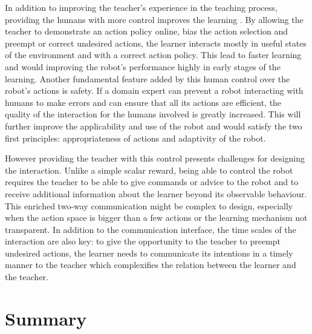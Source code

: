 In addition to improving the teacher's experience in the teaching process, providing the humans with more control improves the learning \citep{thomaz2008teachable,chernova2009interactive}. By allowing the teacher to demonstrate an action policy online, bias the action selection and preempt or correct undesired actions, the learner interacts mostly in useful states of the environment and with a correct action policy. This lead to faster learning and would improving the robot's performance highly in early stages of the learning. Another fundamental feature added by this human control over the robot's actions is safety. If a domain expert can prevent a robot interacting with humans to make errors and can ensure that all its actions are efficient, the quality of the interaction for the humans involved is greatly increased. This will further improve the applicability and use of the robot and would satisfy the two first principles: appropriateness of actions and adaptivity of the robot.

However providing the teacher with this control presents challenges for designing the interaction. Unlike a simple scalar reward, being able to control the robot requires the teacher to be able to give commands or advice to the robot and to receive additional information about the learner beyond its observable behaviour. This enriched two-way communication might be complex to design, especially when the action space is bigger than a few actions or the learning mechanism not transparent. In addition to the communication interface, the time scales of the interaction are also key: to give the opportunity to the teacher to preempt undesired actions, the learner needs to communicate its intentions in a timely manner to the teacher which complexifies the relation between the learner and the teacher. %




\section{Summary}

